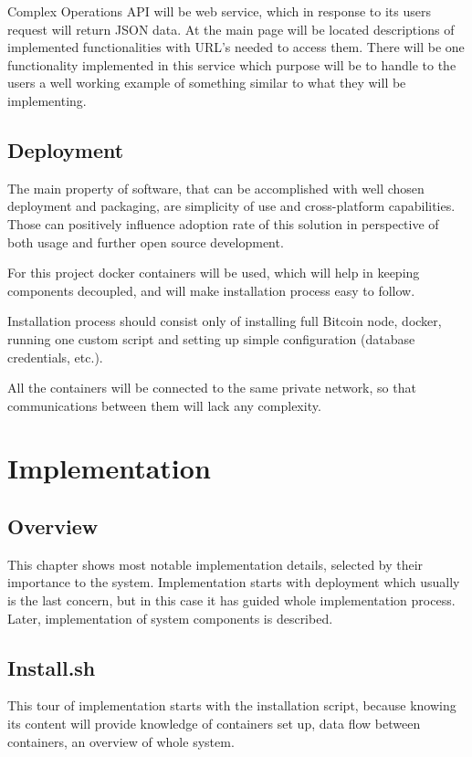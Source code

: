 \documentclass[12pt, en, eng, oneside, final]{mgr}
\begin{document}
Complex Operations API will be web service, which in response to its users request will return JSON data. At the main page will be located descriptions of implemented functionalities with URL's needed to access them. There will be one functionality implemented in this service which purpose will be to handle to the users a well working example of something similar to what they will be implementing.   

\section{Deployment}

The main property of software, that can be accomplished with well chosen deployment and packaging, are simplicity of use and cross-platform capabilities. Those can positively influence adoption rate of this solution in perspective of both usage and further open source development.

For this project docker\cite{docker} containers will be used, which will help in keeping components decoupled, and will make installation process easy to follow. 

Installation process should consist only of installing full Bitcoin node, docker, running one custom script and setting up simple configuration (database credentials, etc.).

All the containers will be connected to the same private network, so that communications between them will lack any complexity.

\chapter{Implementation}

\section{Overview}
This chapter shows most notable implementation details, selected by their importance to the system. Implementation starts with deployment which usually is the last concern, but in this case it has guided whole implementation process. Later, implementation of system components is described.

\section{Install.sh}
This tour of implementation starts with the installation script, because knowing its content will provide knowledge of containers set up, data flow between containers, an overview of whole system.
\end{document}
